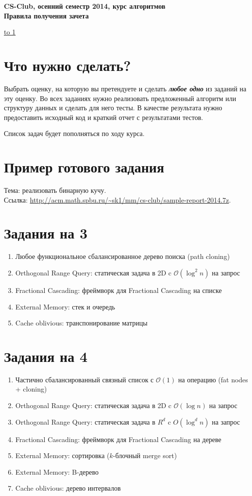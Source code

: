 \documentclass[12pt]{article}
\def\O{\mathcal{O}}
\def\myindent{\hspace*{\parindent}}
\newenvironment{MyList}{
  \begin{enumerate}
  \setlength{\parskip}{-5pt}
  \setlength{\itemsep}{5pt}
}{
  \end{enumerate}
}
\newcommand\Section[1]{\vspace*{-1.5em}\section{#1}}
\begin{document}
\begin{center}
  {\Large \bf CS-Club, осенний семестр 2014, курс алгоритмов} \\ 
  \vspace{0.5em}
  {\Large \bf Правила получения зачета} \\
\end{center}

\vspace{-1em}
\noindent \underline{\hbox to 1\textwidth{{ } \hfil{ } \hfil{ } }}

\Section{Что нужно сделать?}

\myindent{}Выбрать оценку, на которую вы претендуете и сделать {\bf\it любое одно} из заданий на эту оценку.
Во всех заданиях нужно реализовать предложенный алгоритм
или структуру данных и сделать для него тесты.
В качестве результата нужно предоставить
исходный код и краткий отчет с результатами тестов.

\vspace*{0.5em}
Список задач будет пополняться по ходу курса.

\Section{Пример готового задания}

Тема: реализовать бинарную кучу. \\
Ссылка: \url{http://acm.math.spbu.ru/~sk1/mm/cs-club/sample-report-2014.7z}.
              
\Section{Задания на 3}

\begin{MyList}
\item Любое функциональное сбалансированное дерево поиска (path cloning)
\item Orthogonal Range Query: статическая задача в 2D c $\O(\log^2 n)$ на запрос
\item Fractional Cascading: фреймворк для Fractional Cascading на списке
\item External Memory: стек и очередь
\item Cache oblivious: транспонирование матрицы
\end{MyList}

\Section{Задания на 4}

\begin{MyList}
\item Частично сбалансированный связный список с $\O(1)$ на операцию (fat nodes + cloning)
\item Orthogonal Range Query: статическая задача в 2D c $\O(\log n)$ на запрос
\item Orthogonal Range Query: статическая задача в $R^d$ c $O(\log^d n)$ на запрос
\item Fractional Cascading: фреймворк для Fractional Cascading на дереве
\item External Memory: сортировка ($k$-блочный merge sort)
\item External Memory: B-дерево
\item Cache oblivious: дерево интервалов 
\end{MyList}
\end{document}

